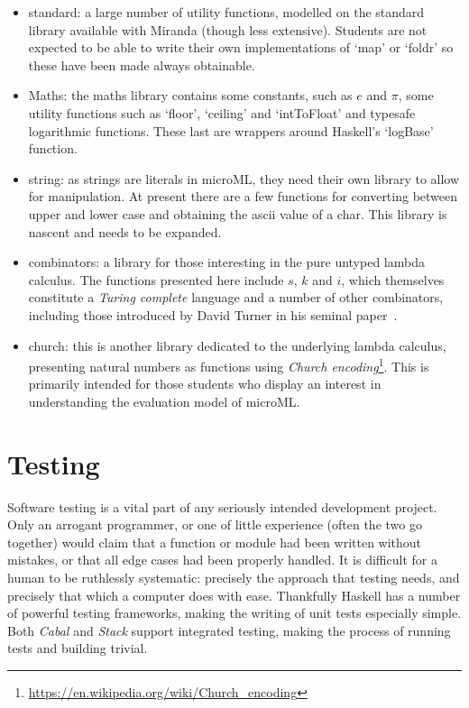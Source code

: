 \documentclass[12pt, a4paper]{report}
\begin{document}
\begin{itemize}
    \item standard: a large number of utility functions, modelled on the standard library available
        with Miranda (though less extensive). Students are not expected to be able to write their
        own implementations of `map' or `foldr' so these have been made always obtainable.
    \item Maths: the maths library contains some constants, such as $e$ and $\pi$, some utility
        functions such as `floor', `ceiling' and `intToFloat' and typesafe logarithmic functions.
        These last are wrappers around Haskell's `logBase' function.
    \item string: as strings are literals in microML, they need their own library to allow for
        manipulation. At present there are a few functions for converting between upper and lower
        case and obtaining the ascii value of a char. This library is nascent and needs to be
        expanded.
    \item combinators: a library for those interesting in the pure untyped lambda calculus. The
        functions presented here include $s$, $k$ and $i$, which themselves constitute a
        \textit{Turing complete} language and a number of other combinators, including those
        introduced by David Turner in his seminal paper~\cite{TUR79a}.
    \item church: this is another library dedicated to the underlying lambda calculus, presenting
        natural numbers as functions using \textit{Church encoding}\footnote{\url{https://en.wikipedia.org/wiki/Church_encoding}}.
        This is primarily intended for those students who display an interest in understanding the
        evaluation model of microML\@.
\end{itemize}

\chapter{Testing}
\label{testing}

Software testing is a vital part of any seriously intended development project. Only an arrogant
programmer, or one of little experience (often the two go together) would claim that a function or
module had been written without mistakes, or that all edge cases had been properly handled. It is
difficult for a human to be ruthlessly systematic: precisely the approach that testing needs, and
precisely that which a computer does with ease. Thankfully Haskell has a number of powerful testing
frameworks, making the writing of unit tests especially simple. Both \textit{Cabal} and
\textit{Stack} support integrated testing, making the process of running tests and building trivial.
\end{document}
